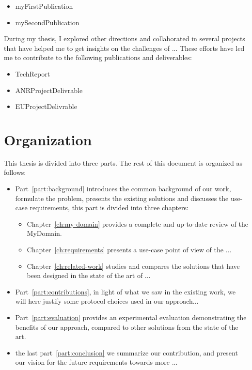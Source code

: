 \begin{itemize}
  \item myFirstPublication %
  \item mySecondPublication %
\end{itemize}

During my thesis, I explored other directions and collaborated in several projects that have helped me to get insights on the challenges of ... These efforts have led me to contribute to the following publications and deliverables:

\begin{itemize}
  \item TechReport %
  \item ANRProjectDelivrable %
  \item EUProjectDelivrable %
\end{itemize}

\section{Organization}
\label{sec:intro:organisation}

This thesis is divided into three parts. 
The rest of this document is organized as follows:
\begin{itemize}
  \item Part~\ref{part:background} introduces the common background of our work,
  formulate the problem, presents the existing solutions and discusses the use-case
  requirements, this part is divided into three chapters:
  \begin{itemize}
    \item Chapter~\ref{ch:my-domain} provides a complete and up-to-date 
    review of the MyDomain.
    \item Chapter~\ref{ch:requirements} presents a use-case point of view of the
    ...
    \item Chapter~\ref{ch:related-work} studies and compares the solutions that have
    been designed in the state of the art of ...
  \end{itemize}
  \item Part~\ref{part:contributions}, in light of what we saw in the existing work, 
  we will here justify some protocol choices used in our approach...
  \item Part~\ref{part:evaluation} provides an experimental evaluation 
  demonstrating the benefits of our approach, compared to other solutions 
  from the state of the art.
  \item the last part~\ref{part:conclusion} we summarize our contribution, and 
  present our vision for the future requirements towards more ...
\end{itemize}

